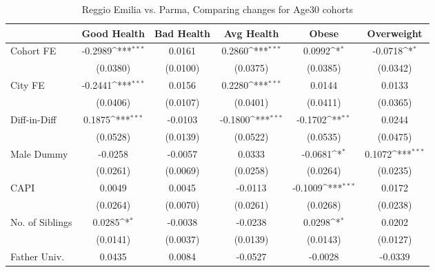 \begin{table}[htbp]\centering
\def\sym#1{\ifmmode^{#1}\else\(^{#1}\)\fi}
\caption{Reggio Emilia vs. Parma, Comparing changes for Age30 cohorts}
\begin{tabular}{l*{5}{c}}
\toprule
            &\multicolumn{1}{c}{Good Health}&\multicolumn{1}{c}{Bad Health}&\multicolumn{1}{c}{Avg Health}&\multicolumn{1}{c}{Obese}&\multicolumn{1}{c}{Overweight}\\
\midrule
Cohort FE   &     -0.2989\sym{***}&      0.0161         &      0.2860\sym{***}&      0.0992\sym{*}  &     -0.0718\sym{*}  \\
            &    (0.0380)         &    (0.0100)         &    (0.0375)         &    (0.0385)         &    (0.0342)         \\
\addlinespace
City FE     &     -0.2441\sym{***}&      0.0156         &      0.2280\sym{***}&      0.0144         &      0.0133         \\
            &    (0.0406)         &    (0.0107)         &    (0.0401)         &    (0.0411)         &    (0.0365)         \\
\addlinespace
Diff-in-Diff&      0.1875\sym{***}&     -0.0103         &     -0.1800\sym{***}&     -0.1702\sym{**} &      0.0244         \\
            &    (0.0528)         &    (0.0139)         &    (0.0522)         &    (0.0535)         &    (0.0475)         \\
\addlinespace
Male Dummy  &     -0.0258         &     -0.0057         &      0.0333         &     -0.0681\sym{*}  &      0.1072\sym{***}\\
            &    (0.0261)         &    (0.0069)         &    (0.0258)         &    (0.0264)         &    (0.0235)         \\
\addlinespace
CAPI        &      0.0049         &      0.0045         &     -0.0113         &     -0.1009\sym{***}&      0.0172         \\
            &    (0.0264)         &    (0.0070)         &    (0.0261)         &    (0.0268)         &    (0.0238)         \\
\addlinespace
No. of Siblings&      0.0285\sym{*}  &     -0.0038         &     -0.0238         &      0.0298\sym{*}  &      0.0202         \\
            &    (0.0141)         &    (0.0037)         &    (0.0139)         &    (0.0143)         &    (0.0127)         \\
\addlinespace
Father Univ.&      0.0435         &      0.0084         &     -0.0527         &     -0.0028         &     -0.0339         \\

\end{tabular}
\end{table}
